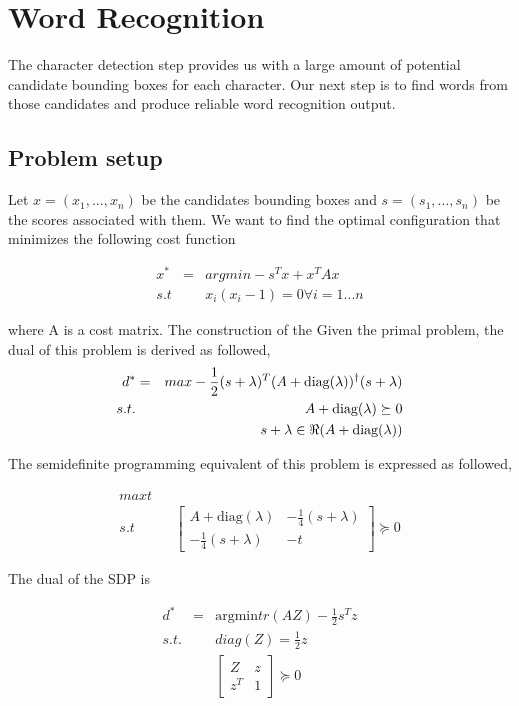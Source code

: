 \documentclass[10pt,twocolumn,letterpaper]{article}
\begin{document}
\section{Word Recognition}

The character detection step provides us with a large amount of potential candidate bounding boxes for each character. Our next step is to find words from those candidates and produce reliable word recognition output.

\subsection{Problem setup}

Let $x=(x_{1},...,x_{n})$ be the candidates bounding boxes and $s=(s_{1},...,s_{n})$
be the scores associated with them. We want to find the optimal configuration
that minimizes the following cost function

\begin{eqnarray*}
x^{*} & = & argmin-s^{T}x+x^{T}Ax\\
s.t &  & x_{i}(x_{i}-1)=0\forall i=1...n
\end{eqnarray*}

where A is a cost matrix. The construction of the Given the primal problem, the dual of this problem is derived as followed,
\begin{eqnarray*}
d^{*} & = & max-\frac{1}{2}(s+\lambda)^{T}(A+\mbox{diag}(\lambda))^{\dagger}(s+\lambda)\\
s.t. &  & A+\mbox{diag}(\lambda)\succeq0\\
 &  & s+\lambda\in\Re(A+\mbox{diag(\ensuremath{\lambda}))}
\end{eqnarray*}

The semidefinite programming equivalent of this problem is expressed as followed,

\begin{eqnarray*}
max t\\
s.t &  & \left[\begin{array}{cc}
A+\mbox{diag}(\lambda) & -\frac{1}{4}(s+\lambda)\\
-\frac{1}{4}(s+\lambda) & -t
\end{array}\right]\succeq0
\end{eqnarray*}

The dual of the SDP is

\begin{eqnarray*}
d^{*} & = & \mbox{argmin}tr(AZ)-\frac{1}{2}s^{T}z\\
s.t. &  & diag(Z)=\frac{1}{2}z\\
 &  & \left[\begin{array}{cc}
Z & z\\
z^{T} & 1
\end{array}\right]\succeq0
\end{eqnarray*}
\end{document}
